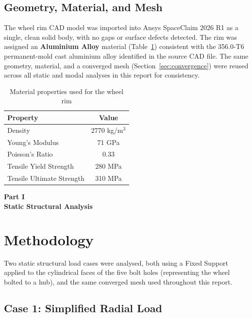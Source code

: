 \documentclass[11pt]{article}
\begin{document}
\subsection{Geometry, Material, and Mesh}

The wheel rim CAD model was imported into Ansys SpaceClaim 2026 R1 as a single, clean
solid body, with no gaps or surface defects detected. The rim was assigned an
\textbf{Aluminium Alloy} material (Table~\ref{tab:material}) consistent with the
356.0-T6 permanent-mold cast aluminium alloy identified in the source CAD file. The same
geometry, material, and a converged mesh (Section~\ref{sec:convergence}) were reused
across all static and modal analyses in this report for consistency.

\begin{table}[H]
\centering
\caption{Material properties used for the wheel rim}
\label{tab:material}
\begin{tabular}{lc}
\toprule
\textbf{Property} & \textbf{Value} \\
\midrule
Density & 2770 kg/m$^3$ \\
Young's Modulus & 71 GPa \\
Poisson's Ratio & 0.33 \\
Tensile Yield Strength & 280 MPa \\
Tensile Ultimate Strength & 310 MPa \\
\bottomrule
\end{tabular}
\end{table}

\begin{center}
{\LARGE\bfseries Part I}\\[0.3em]
{\Large\bfseries Static Structural Analysis}
\end{center}
\vspace{0.5em}

\section{Methodology}

Two static structural load cases were analysed, both using a Fixed Support applied to the
cylindrical faces of the five bolt holes (representing the wheel bolted to a hub), and the
same converged mesh used throughout this report.

\subsection{Case 1: Simplified Radial Load}
\end{document}
